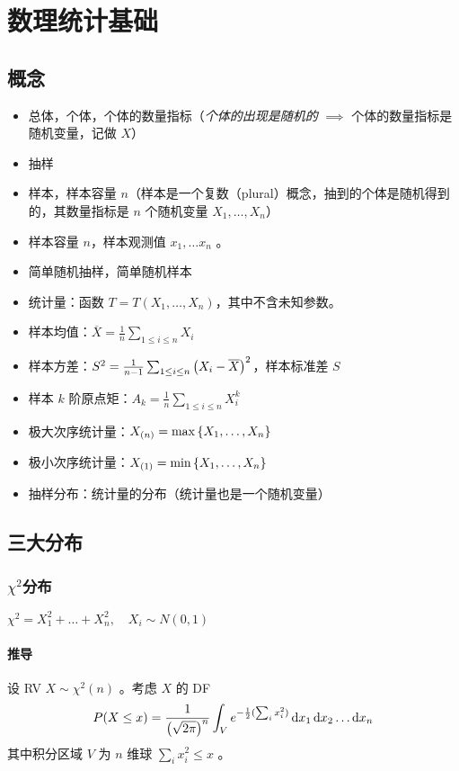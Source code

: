 \documentclass[12pt,uft8]{ctexrep}
\newcommand{\dif}{\mathop{}\!\mathrm{d}}
\begin{document}
\chapter{数理统计基础}
\section{概念}
\begin{itemize}
\item 总体，个体，个体的数量指标（\emph{个体的出现是随机的} $\implies$ 个体的数量指标是随机变量，记做 $X$）
\item 抽样
\item 样本，样本容量 $n$（样本是一个复数（plural）概念，抽到的个体是随机得到的，其数量指标是 $n$ 个随机变量 $X_1, \dots, X_n$）
\item 样本容量 $n$，样本观测值 $x_1, \dots x_n$ 。
\item 简单随机抽样，简单随机样本
\item 统计量：函数 $T = T(X_1, \dots, X_n)$，其中不含未知参数。
\item 样本均值：$\overline{X} = \frac1n \sum_{1\le i\le n} X_i$
\item 样本方差：$S^2 = \frac{1}{n-1}\sum_{1\le i\le n} \qty(X_i - \overline{X})^2$，样本标准差 $S$
\item 样本 $k$ 阶原点矩：$A_k = \frac{1}{n}\sum_{1\le i\le n} X_i^k$
\item 极大次序统计量：$X_{(n)} = \max\qty{X_1, \dots, X_n}$
\item 极小次序统计量：$X_{(1)} = \min\qty{X_1, \dots, X_n}$
\item 抽样分布：统计量的分布（统计量也是一个随机变量）
\end{itemize}

\section{三大分布}
\subsection{$\chi^2$分布}
 $\chi^2 = X_1^2 + \dots + X_n^2, \quad X_i\sim N(0,1)$

\subsubsection{推导}
设 RV $X\sim \chi^2(n)$ 。考虑 $X$ 的 DF
$$ P(X \le x)  = \frac1{\qty(\sqrt{2\pi})^n} \int_{V} e^{-\frac12(\sum_i x_i^2)}  \dif x_1 \dif x_2 \dots \dif x_n $$
其中积分区域 $V$ 为 $n$ 维球 $\sum_i x_i^2 \le x$ 。
\end{document}
